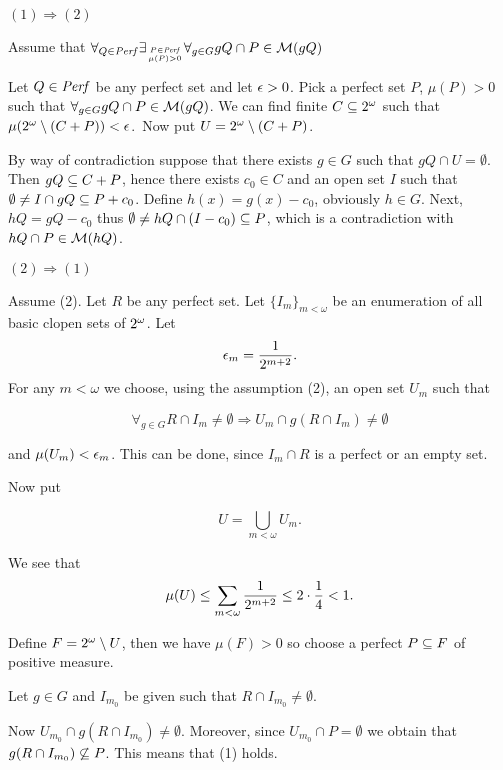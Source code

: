 \proof

$(1) \Rightarrow (2)$
\par
Assume that
$\forall_{Q \in {\it Perf}} \exists_{P \in {\it Perf} \atop \mu(P) > 0}
\forall_{g \in G} gQ \cap P \in {\cal M}(gQ)$

Let $Q \in {\it Perf}$ be any perfect set and let $\epsilon > 0$.
Pick a perfect set $P$, $\mu(P) > 0$ such
that $\forall_{g \in G} gQ \cap P \in {\cal M}(gQ)$.
We can find finite $C \subseteq 2^{\omega}$ such that
$\mu(2^{\omega} \setminus (C+P)) < \epsilon$.\
Now put $U = 2^{\omega} \setminus (C+P)$.

By way of contradiction suppose that
there exists $g \in G$ such that
$gQ \cap U = \emptyset$.
Then $gQ \subseteq C + P$, hence
there exists $c_0 \in C$ and an open set $I$
such that $\emptyset \not = I \cap gQ \subseteq P + c_0$.
  Define $h(x) = g(x) - c_0$, obviously $h \in G$.
Next, $hQ = gQ - c_0$ thus
$\emptyset \not = hQ \cap (I - c_0) \subseteq P$,
which is a contradiction with
$hQ \cap P \in {\cal M}(hQ)$.


\medskip

$(2) \Rightarrow (1)$

Assume (2). Let $R$ be any perfect
set. Let $\{ I_m \} _{m < \omega}$
be an enumeration of all basic clopen sets of $2^{\omega}$.
Let
  \[\epsilon_{m} = {1 \over 2^{m + 2}}.\]
For any $m < \omega$
we choose, using the assumption (2),
an open set $U_{m}$ such that

\[
\forall_{g\in G} R \cap I_m \not = \emptyset
\Rightarrow U_{m} \cap g(R \cap I_m) \not = \emptyset
\]

and $\mu(U_{m}) < \epsilon_{m}$.
This can be done, since
$I_m \cap R$ is a perfect or an empty set.

Now put

\[ U = \bigcup_{m < \omega} U_m. \]

We see that
\[
\mu(U) \leq \sum_{m < \omega}
{1 \over 2^{m + 2}} \leq 2 \cdot {1 \over 4} < 1.
\]

Define $F = 2^{\omega} \setminus U$, then we have
$\mu(F) > 0$
so choose a perfect $P \subseteq F$ of positive
measure.

  Let $g \in G$ and $I_{m_0}$ be given such that
$R \cap I_{m_0} \not = \emptyset$.

Now $U_{m_0} \cap g(R \cap I_{m_0}) \not = \emptyset$.
Moreover, since
$U_{m_0} \cap P = \emptyset$
we obtain that $g(R \cap I_{m_0}) \not \subseteq P$.
This means that (1) holds.

